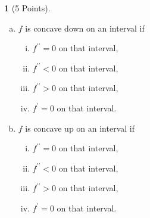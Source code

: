 \documentclass[12pt]{amsart}
\theoremstyle{definition}
\newtheorem{thm}{}
\theoremstyle{definition}
\begin{document}
\begin{thm}[5 Points]
\begin{enumerate}[(a)]
\begin{multicols}{2}
\begin{enumerate}[(i)]
      \end{enumerate}
    \end{multicols}
  \item
    $f$ is concave down on an interval if
    \begin{multicols}{2}
      \begin{enumerate}[(i)]
      \item
        $f^{\prime\prime} = 0$ on that interval,
        \vspace{.05in}
      \item
        $f^{\prime\prime} < 0$ on that interval,
      \item
        $f^{\prime\prime} > 0$ on that interval,
        \vspace{.05in}
      \item
        $f^\prime = 0$ on that interval.
      \end{enumerate}
    \end{multicols}
  \item
    $f$ is concave up on an interval if
    \begin{multicols}{2}
      \begin{enumerate}[(i)]
      \item
        $f^{\prime\prime} = 0$ on that interval,
        \vspace{.05in}
      \item
        $f^{\prime\prime} < 0$ on that interval,
      \item
        \vspace{.05in}
        $f^{\prime\prime} > 0$ on that interval,
      \item
        $f^\prime = 0$ on that interval.
      \end{enumerate}
    \end{multicols}
  \end{enumerate}
\end{thm}

\newpage
\end{document}
